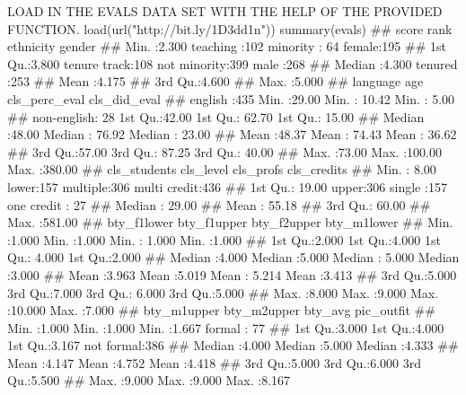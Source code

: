 
LOAD IN THE EVALS DATA SET WITH THE HELP OF THE PROVIDED FUNCTION.
load(url("http://bit.ly/1D3dd1n"))
summary(evals)
##      score                 rank            ethnicity      gender   
##  Min.   :2.300   teaching    :102   minority    : 64   female:195  
##  1st Qu.:3.800   tenure track:108   not minority:399   male  :268  
##  Median :4.300   tenured     :253                                  
##  Mean   :4.175                                                     
##  3rd Qu.:4.600                                                     
##  Max.   :5.000                                                     
##         language        age        cls_perc_eval     cls_did_eval   
##  english    :435   Min.   :29.00   Min.   : 10.42   Min.   :  5.00  
##  non-english: 28   1st Qu.:42.00   1st Qu.: 62.70   1st Qu.: 15.00  
##                    Median :48.00   Median : 76.92   Median : 23.00  
##                    Mean   :48.37   Mean   : 74.43   Mean   : 36.62  
##                    3rd Qu.:57.00   3rd Qu.: 87.25   3rd Qu.: 40.00  
##                    Max.   :73.00   Max.   :100.00   Max.   :380.00  
##   cls_students    cls_level      cls_profs         cls_credits 
##  Min.   :  8.00   lower:157   multiple:306   multi credit:436  
##  1st Qu.: 19.00   upper:306   single  :157   one credit  : 27  
##  Median : 29.00                                                
##  Mean   : 55.18                                                
##  3rd Qu.: 60.00                                                
##  Max.   :581.00                                                
##   bty_f1lower     bty_f1upper     bty_f2upper      bty_m1lower   
##  Min.   :1.000   Min.   :1.000   Min.   : 1.000   Min.   :1.000  
##  1st Qu.:2.000   1st Qu.:4.000   1st Qu.: 4.000   1st Qu.:2.000  
##  Median :4.000   Median :5.000   Median : 5.000   Median :3.000  
##  Mean   :3.963   Mean   :5.019   Mean   : 5.214   Mean   :3.413  
##  3rd Qu.:5.000   3rd Qu.:7.000   3rd Qu.: 6.000   3rd Qu.:5.000  
##  Max.   :8.000   Max.   :9.000   Max.   :10.000   Max.   :7.000  
##   bty_m1upper     bty_m2upper       bty_avg           pic_outfit 
##  Min.   :1.000   Min.   :1.000   Min.   :1.667   formal    : 77  
##  1st Qu.:3.000   1st Qu.:4.000   1st Qu.:3.167   not formal:386  
##  Median :4.000   Median :5.000   Median :4.333                   
##  Mean   :4.147   Mean   :4.752   Mean   :4.418                   
##  3rd Qu.:5.000   3rd Qu.:6.000   3rd Qu.:5.500                   
##  Max.   :9.000   Max.   :9.000   Max.   :8.167                   
